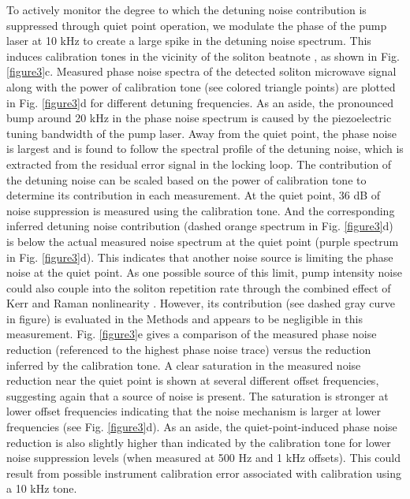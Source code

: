 \documentclass[noshowpacs,amsmath,
twocolumn,
superscriptaddress,
8pt,
aps,prb]{revtex4-2}
\begin{document}
To actively monitor the degree to which the detuning noise contribution is suppressed through quiet point operation, we modulate the phase of the pump laser at 10 kHz to create a large spike in the detuning noise spectrum. This induces calibration tones in the vicinity of the soliton beatnote \cite{lucas2020ultralow}, as shown in Fig. \ref{figure3}c. Measured phase noise spectra of the detected soliton microwave signal along with the power of calibration tone (see colored triangle points) are plotted in Fig. \ref{figure3}d for different detuning frequencies. As an aside, the pronounced bump around 20 kHz in the phase noise spectrum is caused by the piezoelectric tuning bandwidth of the pump laser. Away from the quiet point, the phase noise is largest and is found to follow the spectral profile of the detuning noise, which is extracted from the residual error signal in the locking loop. The contribution of the detuning noise can be scaled based on the power of calibration tone to determine its contribution in each measurement. At the quiet point, 36 dB of noise suppression is measured using the calibration tone. And the corresponding inferred detuning noise contribution (dashed orange spectrum in Fig. \ref{figure3}d) is below the actual measured noise spectrum at the quiet point (purple spectrum in Fig. \ref{figure3}d). This indicates that another noise source is limiting the phase noise at the quiet point. As one possible source of this limit, pump intensity noise could also couple into the soliton repetition rate through the combined effect of Kerr and Raman nonlinearity \cite{stone2018thermal,lucas2020ultralow}. However, its contribution (see dashed gray curve in figure) is evaluated in the Methods and appears to be negligible in this measurement. Fig. \ref{figure3}e gives a comparison of the measured phase noise reduction (referenced to the highest phase noise trace) versus the reduction inferred by the calibration tone. A clear saturation in the measured noise reduction near the quiet point is shown at several different offset frequencies, suggesting again that a source of noise is present. The saturation is stronger at lower offset frequencies indicating that the noise mechanism is larger at lower frequencies (see Fig. \ref{figure3}d). As an aside, the quiet-point-induced phase noise reduction is also slightly higher than indicated by the calibration tone for lower noise suppression levels (when measured at 500 Hz and 1 kHz offsets). This could result from possible instrument calibration error associated with calibration using a 10 kHz tone. 
\end{document}
